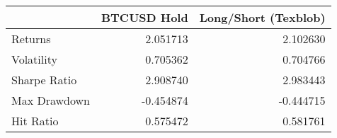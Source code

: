 \begin{tabular}{lrr}
\toprule
{} &  BTCUSD Hold &  Long/Short (Texblob) \\
\midrule
Returns      &     2.051713 &              2.102630 \\
Volatility   &     0.705362 &              0.704766 \\
Sharpe Ratio &     2.908740 &              2.983443 \\
Max Drawdown &    -0.454874 &             -0.444715 \\
Hit Ratio    &     0.575472 &              0.581761 \\
\bottomrule
\end{tabular}

